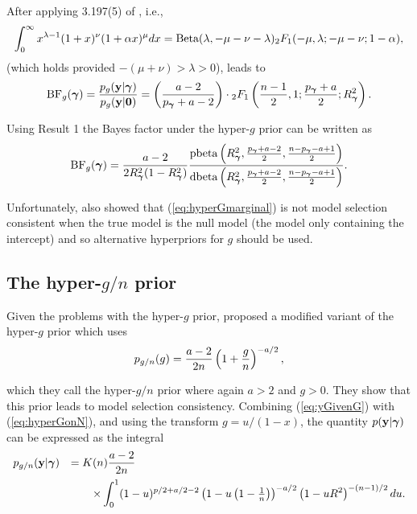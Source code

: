 \noindent After applying 3.197(5) of \cite{Gradshteyn2007}, i.e.,
\begin{equation}\label{eq:31975}
	\displaystyle 
	\int_0^\infty x^{\lambda - 1}(1 + x)^\nu (1 + \alpha x)^\mu dx
	=\mbox{Beta}(\lambda,-\mu-\nu-\lambda){}_2F_1(-\mu,\lambda;-\mu-\nu; 1 - \alpha),
\end{equation}
\noindent (which holds provided $-(\mu  + \nu) > \lambda > 0$), leads to
\begin{equation}\label{eq:hyperGmarginal}
	\displaystyle \mbox{BF}_{g}({\boldsymbol \gamma}) = \frac{p_{g}({\bf y}|{\boldsymbol \gamma})}{p_{g}({\bf y}|{\bf 0})} =  \left( \frac{a - 2}{p_{\boldsymbol \gamma} + a - 2} \right) \cdot {}_2F_1\left( \frac{n-1}{2}, 1; \frac{p_{\boldsymbol \gamma} + a}{2}; R_{\boldsymbol \gamma}^2 \right).
\end{equation}

\noindent Using Result 1 the Bayes factor under the hyper-$g$ prior can be
written as
\begin{equation}\label{eq:hyperGmarginal2}
	\displaystyle \mbox{BF}_{g}({\boldsymbol \gamma}) 
	=  
	\frac{a - 2}{2 R_{\boldsymbol \gamma}^2(1 - R_{\boldsymbol \gamma}^2)} 
	\frac{\mbox{pbeta}\left(R_{\boldsymbol \gamma}^2,\tfrac{p_{\boldsymbol \gamma} + a - 2}{2},\tfrac{n-p_{\boldsymbol \gamma} - a+1}{2}\right)}{
		\mbox{dbeta}\left(R_{\boldsymbol \gamma}^2,\tfrac{p_{\boldsymbol \gamma} + a - 2}{2},\tfrac{n-p_{\boldsymbol \gamma} - a+1}{2}\right)}.
\end{equation}

\noindent Unfortunately, \cite{Liang2008} also showed that
(\ref{eq:hyperGmarginal}) is not model selection consistent when the true model
is the null model (the model only containing the intercept) and so alternative
hyperpriors for $g$ should be used.

\subsection{The hyper-$g/n$ prior}

Given the problems with the hyper-$g$ prior, \cite{Liang2008} proposed a
modified variant of the hyper-$g$ prior which uses
\begin{equation}\label{eq:hyperGonN}
	\displaystyle p_{g/n}(g) = \frac{a - 2}{2n}\left( 1 + \frac{g}{n} \right)^{-a/2},
\end{equation}

\noindent which they call the hyper-$g/n$ prior where again $a>2$ and $g>0$.
They show that this prior leads to model selection consistency.  Combining
(\ref{eq:yGivenG}) with (\ref{eq:hyperGonN}), and using the transform $g = u/(1
- x)$, the quantity $p({\bf y}|{\boldsymbol \gamma})$ can be expressed as the integral
\begin{equation}\label{eq:hyperGonNmarginalIntegral}
	\begin{array}{rl}
		p_{g/n}({\bf y}|{\boldsymbol \gamma}) 
		& \displaystyle = K(n) \frac{a - 2}{2n}  
		\\ [2ex]
		& \displaystyle \qquad \times \int_0^1 
		(1 - u)^{p/2 + a/2 - 2  } \left(  1 - u \left(1  -  \tfrac{1}{n} \right) \right)^{-a/2} \left(  1 - u R^2\right)^{-(n-1)/2} du.
	\end{array} 
\end{equation}

